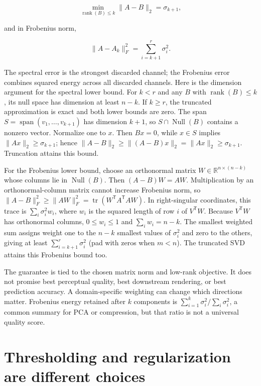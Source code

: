 \[
\min_{\operatorname{rank}(B)\le k}\|A-B\|_2=\sigma_{k+1},
\]

and in Frobenius norm,

\[
\|A-A_k\|_F^2=\sum_{i=k+1}^{r}\sigma_i^2.
\]

The spectral error is the strongest discarded channel; the Frobenius error combines squared energy across all discarded channels. Here is the dimension argument for the spectral lower bound. For \(k<r\) and any \(B\) with \(\operatorname{rank}(B)\le k\), its null space has dimension at least \(n-k\). If \(k\ge r\), the truncated approximation is exact and both lower bounds are zero. The span \(S=\operatorname{span}(v_1,\ldots,v_{k+1})\) has dimension \(k+1\), so \(S\cap\operatorname{Null}(B)\) contains a nonzero vector. Normalize one to \(x\). Then \(Bx=0\), while \(x\in S\) implies \(\|Ax\|_2\ge\sigma_{k+1}\); hence \(\|A-B\|_2\ge\|(A-B)x\|_2=\|Ax\|_2\ge\sigma_{k+1}\). Truncation attains this bound.

For the Frobenius lower bound, choose an orthonormal matrix \(W\in\mathbb R^{n\times(n-k)}\) whose columns lie in \(\operatorname{Null}(B)\). Then \((A-B)W=AW\). Multiplication by an orthonormal-column matrix cannot increase Frobenius norm, so \(\|A-B\|_F^2\ge\|AW\|_F^2=\operatorname{tr}(W^\mathsf TA^\mathsf TAW)\). In right-singular coordinates, this trace is \(\sum_i\sigma_i^2 w_i\), where \(w_i\) is the squared length of row \(i\) of \(V^\mathsf TW\). Because \(V^\mathsf TW\) has orthonormal columns, \(0\le w_i\le1\) and \(\sum_iw_i=n-k\). The smallest weighted sum assigns weight one to the \(n-k\) smallest values of \(\sigma_i^2\) and zero to the others, giving at least \(\sum_{i=k+1}^{r}\sigma_i^2\) (pad with zeros when \(m<n\)). The truncated SVD attains this Frobenius bound too.

The guarantee is tied to the chosen matrix norm and low-rank objective. It does not promise best perceptual quality, best downstream rendering, or best prediction accuracy. A domain-specific weighting can change which directions matter. Frobenius energy retained after \(k\) components is \(\sum_{i=1}^k\sigma_i^2/\sum_i\sigma_i^2\), a common summary for PCA or compression, but that ratio is not a universal quality score.

\section{Thresholding and regularization are different choices}\label{02-foundations-ii-ch024-thresholding-and-regularization-are-different-choices}

